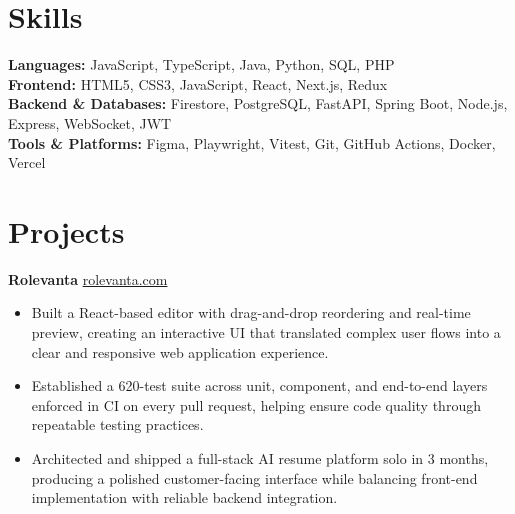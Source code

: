 \documentclass[11pt]{article}       %
\begin{document}
\vspace{-10.5pt}

\section*{Skills}
\textbf{Languages:} JavaScript, TypeScript, Java, Python, SQL, PHP \\
\textbf{Frontend:} HTML5, CSS3, JavaScript, React, Next.js, Redux \\
\textbf{Backend \& Databases:} Firestore, PostgreSQL, FastAPI, Spring Boot, Node.js, Express, WebSocket, JWT \\
\textbf{Tools \& Platforms:} Figma, Playwright, Vitest, Git, GitHub Actions, Docker, Vercel
\vspace{-5pt}






\section*{Projects}
\textbf{Rolevanta} \hfill \href{https://rolevanta.com}{rolevanta.com} \\
\vspace{-9pt}
\begin{itemize}
  \item Built a React-based editor with drag-and-drop reordering and real-time preview, creating an interactive UI that translated complex user flows into a clear and responsive web application experience.
  \item Established a 620-test suite across unit, component, and end-to-end layers enforced in CI on every pull request, helping ensure code quality through repeatable testing practices.
  \item Architected and shipped a full-stack AI resume platform solo in 3 months, producing a polished customer-facing interface while balancing front-end implementation with reliable backend integration.
\end{itemize}
\end{document}
